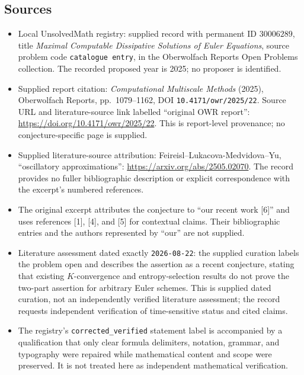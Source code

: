 \documentclass[11pt]{article}
\begin{document}
\subsection{Sources}
\begin{itemize}
\item Local UnsolvedMath registry: supplied record with permanent ID \(30006289\), title \emph{Maximal Computable Dissipative Solutions of Euler Equations}, source problem code \texttt{catalogue entry}, in the Oberwolfach Reports Open Problems collection. The recorded proposed year is 2025; no proposer is identified.
\item Supplied report citation: \emph{Computational Multiscale Methods} (2025), Oberwolfach Reports, pp.\ 1079--1162, DOI \texttt{10.4171/owr/2025/22}. Source URL and literature-source link labelled ``original OWR report'': \url{https://doi.org/10.4171/owr/2025/22}. This is report-level provenance; no conjecture-specific page is supplied.
\item Supplied literature-source attribution: Feireisl--Lukacova-Medvidova--Yu, ``oscillatory approximations'': \url{https://arxiv.org/abs/2505.02070}. The record provides no fuller bibliographic description or explicit correspondence with the excerpt's numbered references.
\item The original excerpt attributes the conjecture to ``our recent work [6]'' and uses references [1], [4], and [5] for contextual claims. Their bibliographic entries and the authors represented by ``our'' are not supplied.
\item Literature assessment dated exactly \texttt{2026-08-22}: the supplied curation labels the problem open and describes the assertion as a recent conjecture, stating that existing \(K\)-convergence and entropy-selection results do not prove the two-part assertion for arbitrary Euler schemes. This is supplied dated curation, not an independently verified literature assessment; the record requests independent verification of time-sensitive status and cited claims.
\item The registry's \texttt{corrected\_verified} statement label is accompanied by a qualification that only clear formula delimiters, notation, grammar, and typography were repaired while mathematical content and scope were preserved. It is not treated here as independent mathematical verification.
\end{itemize}
\end{document}

